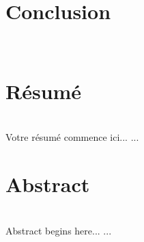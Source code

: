 \documentclass[12pt,a4paper]{article}
\begin{document}
\section{Conclusion}

\newpage
\strut  ~  \mbox{}  \null
\newpage

  

%
% 
%
%
%
% 
% 

\newpage 
\thispagestyle{empty}
\section*{Résumé}~\\[0.2cm]
Votre résumé commence ici...
   ...
\section*{Abstract}~\\[0.2cm]
 Abstract begins here...
   ...
\end{document}
